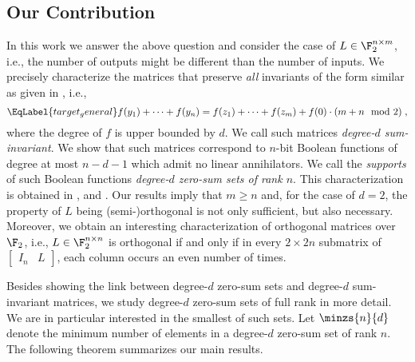 \subsection{Our Contribution} In this work we answer the above question and consider the case of $L \in \F_2^{n \times m}$, i.e., the number of outputs might be different than the number of inputs. We precisely characterize the matrices that preserve \emph{all} invariants of the form similar as given in , i.e.,
\begin{equation}
\EqLabel{target_general}
    f(y_1) + \dots + f(y_{n}) = f(z_1) + \dots + f(z_{m}) + f(0)\cdot (m+n \mod 2)\;,
\end{equation}
where the degree of $f$ is upper bounded by $d$. We call such matrices \emph{degree-$d$ sum-invariant}. We show that such matrices correspond to $n$-bit Boolean functions of degree at most $n-d-1$ which admit no linear annihilators. We call the \emph{supports} of such Boolean functions \emph{degree-$d$ zero-sum sets of rank $n$}. This characterization is obtained in ,  and . Our results imply that $m \geq n$ and, for the case of $d=2$, the property of $L$ being (semi-)orthogonal is not only sufficient, but also necessary. Moreover, we obtain an interesting characterization of orthogonal matrices over $\F_2$, i.e., $L \in \F_2^{n \times n}$ is orthogonal if and only if in every $2 \times 2n$ submatrix of $\left[\begin{array}{c|c}I_n & L\end{array}\right]$, each column occurs an even number of times.

Besides showing the link between degree-$d$ zero-sum sets and degree-$d$ sum-invariant matrices, we study degree-$d$ zero-sum sets of full rank in more detail. We are in particular interested in the smallest of such sets. Let $\minzs{n}{d}$ denote the minimum number of elements in a degree-$d$ zero-sum set of rank $n$. The following theorem summarizes our main results.

